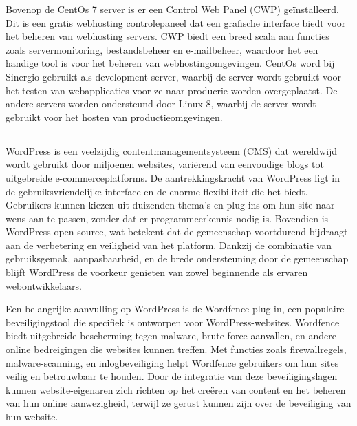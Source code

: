 Bovenop de CentOs 7 server is er een Control Web Panel (CWP) geïnstalleerd. Dit is een gratis webhosting controlepaneel dat
een grafische interface biedt voor het beheren van webhosting servers. CWP biedt een breed scala aan functies zoals
servermonitoring, bestandsbeheer en e-mailbeheer, waardoor het een handige tool is voor het beheren van webhostingomgevingen.
CentOs word bij Sinergio gebruikt als development server, waarbij de server wordt gebruikt voor het testen van webapplicaties 
voor ze naar producrie worden overgeplaatst. De andere servers worden ondersteund door Linux 8, waarbij de server wordt 
gebruikt voor het hosten van productieomgevingen.

\subsection{}
WordPress is een veelzijdig contentmanagementsysteem (CMS) dat wereldwijd wordt gebruikt door miljoenen websites, variërend van 
eenvoudige blogs tot uitgebreide e-commerceplatforms. De aantrekkingskracht van WordPress ligt in de gebruiksvriendelijke 
interface en de enorme flexibiliteit die het biedt. Gebruikers kunnen kiezen uit duizenden thema's en plug-ins om hun site 
naar wens aan te passen, zonder dat er programmeerkennis nodig is. Bovendien is WordPress open-source, wat betekent dat de 
gemeenschap voortdurend bijdraagt aan de verbetering en veiligheid van het platform. Dankzij de combinatie van gebruiksgemak, 
aanpasbaarheid, en de brede ondersteuning door de gemeenschap blijft WordPress de voorkeur genieten van zowel beginnende als 
ervaren webontwikkelaars.

Een belangrijke aanvulling op WordPress is de Wordfence-plug-in, een populaire beveiligingstool die specifiek is ontworpen 
voor WordPress-websites. Wordfence biedt uitgebreide bescherming tegen malware, brute force-aanvallen, en andere online 
bedreigingen die websites kunnen treffen. Met functies zoals firewallregels, malware-scanning, en inlogbeveiliging helpt 
Wordfence gebruikers om hun sites veilig en betrouwbaar te houden. Door de integratie van deze beveiligingslagen kunnen 
website-eigenaren zich richten op het creëren van content en het beheren van hun online aanwezigheid, terwijl ze gerust 
kunnen zijn over de beveiliging van hun website.

